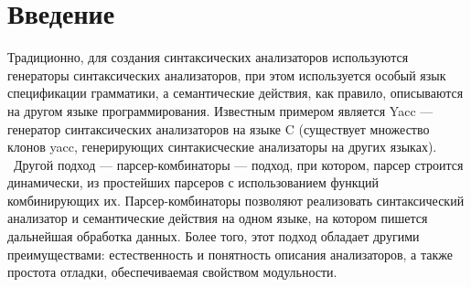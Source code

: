 \documentclass[14pt]{matmex-diploma}
\begin{document}
\maketitle
\tableofcontents
\section*{Введение}
Традиционно, для создания синтаксических анализаторов используются генераторы 
синтаксических анализаторов, при этом используется особый язык спецификации 
грамматики, а семантические действия, как правило, 
описываются на другом языке программирования.
Известным примером является Yacc \cite{yaccsite} --- генератор синтаксических анализаторов на языке C 
(существует множество клонов yacc, генерирующих синтакисческие анализаторы на других языках). \ 
Другой подход --- парсер-комбинаторы --- подход, при котором, парсер строится динамически, 
из простейших парсеров с использованием функций комбинирующих их. Парсер-комбинаторы позволяют 
реализовать синтаксический анализатор и семантические действия на одном языке, 
на котором пишется дальнейшая обработка данных. 
Более того, этот подход обладает другими преимуществами: 
  естественность и понятность описания анализаторов, а также простота отладки,
  обеспечиваемая свойством модульности. 
\end{document}
